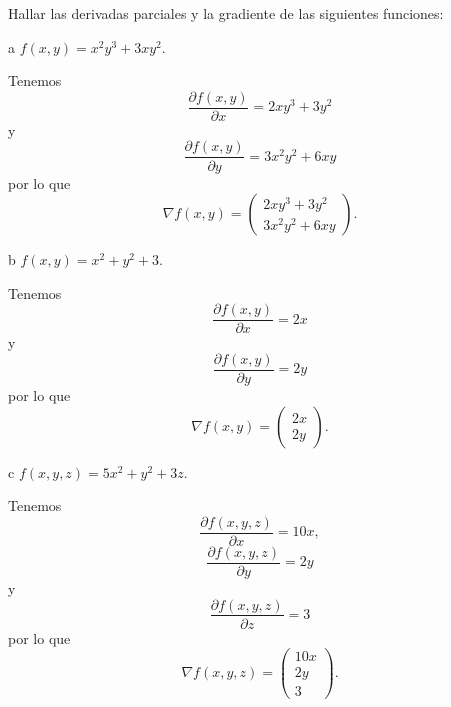 \begin{statement}{4}
  Hallar las derivadas parciales y la gradiente de las siguientes funciones:
\end{statement}

\begin{statement}{a}
  $f(x, y) = x^2 y^3 + 3 x y^2$.
\end{statement}

\begin{solution}
  Tenemos
  \[
    \frac{\partial f(x, y)}{\partial x} = 2xy^3 + 3y^2
  \]
  y
  \[
    \frac{\partial f(x, y)}{\partial y} = 3x^2 y^2 + 6xy 
  \]
  por lo que
  \[
    \nabla f(x, y) = \begin{pmatrix}
      2xy^3 + 3y^2 \\
      3x^2 y^2 + 6xy
    \end{pmatrix}.
  \]
\end{solution}

\begin{statement}{b}
  $f(x, y) = x^2 + y^2 + 3$.
\end{statement}

\begin{solution}
  Tenemos
  \[
    \frac{\partial f(x, y)}{\partial x} = 2x
  \]
  y
  \[
    \frac{\partial f(x, y)}{\partial y} = 2y
  \]
  por lo que
  \[
    \nabla f(x, y) = \begin{pmatrix}
      2x \\
      2y
    \end{pmatrix}.
  \]
\end{solution}

\begin{statement}{c}
  $f(x, y, z) = 5x^2 + y^2 + 3z$.
\end{statement}

\begin{solution}
  Tenemos
  \[
    \frac{\partial f(x, y, z)}{\partial x} = 10x,
  \]
  \[
    \frac{\partial f(x, y, z)}{\partial y} = 2y
  \]
  y
  \[
    \frac{\partial f(x, y, z)}{\partial z} = 3
  \]
  por lo que
  \[
    \nabla f(x, y, z) = \begin{pmatrix}
      10x \\
      2y \\
      3
    \end{pmatrix}.
  \]
\end{solution}